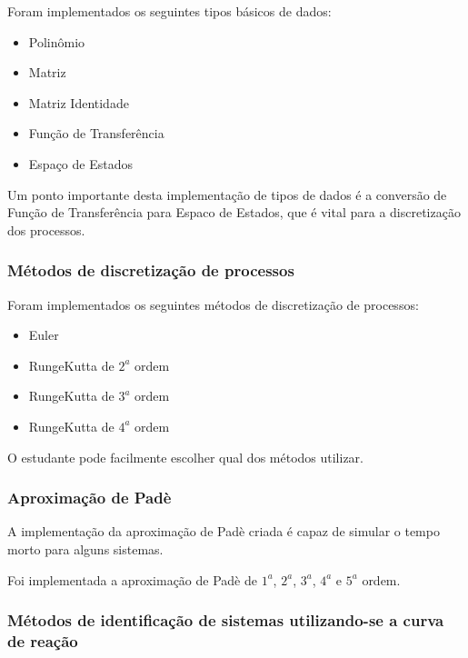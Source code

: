             Foram implementados os seguintes tipos básicos de dados:
        
            \begin{itemize}
                \item Polinômio
                \item Matriz
                \item Matriz Identidade
                \item Função de Transferência
                \item Espaço de Estados
            \end{itemize}

            Um ponto importante desta implementação de tipos de dados é a conversão de Função
            de Transferência para Espaco de Estados, que é vital para a discretização dos
            processos.

        \subsubsection{Métodos de discretização de processos}

            Foram implementados os seguintes métodos de discretização de processos:

            \begin{itemize}
                \item Euler
                \item RungeKutta de $2^a$ ordem
                \item RungeKutta de $3^a$ ordem
                \item RungeKutta de $4^a$ ordem
            \end{itemize}

            O estudante pode facilmente escolher qual dos métodos utilizar.

        \subsubsection{Aproximação de Padè}
            
            A implementação da aproximação de Padè criada é capaz de simular o tempo morto
            para alguns sistemas.

            Foi implementada a aproximação de Padè de $1^a$, $2^a$, $3^a$, $4^a$ e $5^a$ ordem.

        \subsubsection{Métodos de identificação de sistemas utilizando-se a curva de reação}
            
